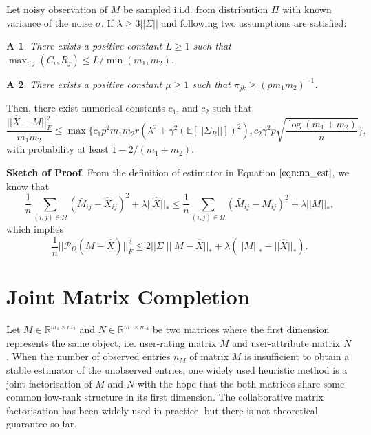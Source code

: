 \documentclass{article} %
\newtheorem{assumption}{A}
\begin{document}
\begin{theorem} 
Let noisy observation of $M$ be sampled i.i.d. from distribution $\Pi$ with known variance of the noise $\sigma$. If $\lambda \geq 3||\Sigma||$ and following two assumptions are satisfied:

\begin{assumption}
There exists a positive constant $L \geq 1 $ such that
$\max_{i,j}(C_i, R_j) \leq L / \min(m_1, m_2)$.
\end{assumption}

\begin{assumption}
There exists a positive constant $\mu \geq 1 $ such that
$\pi_{jk} \geq (p m_1 m_2)^{-1}$.
\end{assumption}

Then, there exist numerical constants $c_1$, and $c_2$ such that
\begin{equation}
\frac{||\hat{X} - M||_F^2}{m_1m_2} \leq \max\bigg\{ c_1 p^2 m_1 m_2 r (\lambda^2 + \gamma^2(\mathbb{E}[||\Sigma_R||])^2), c_2\gamma^2p\sqrt{\frac{\log(m_1 + m_2)}{n}} \bigg\},
\end{equation}
with probability at least $1 - 2/(m_1 + m_2)$.
\end{theorem}

\textbf{Sketch of Proof}. From the definition of estimator in Equation $\ref{eqn:nn_est}$, we know that
\begin{equation}
\frac{1}{n} \sum_{(i,j) \in \Omega}(\bar{M}_{ij} - \hat{X}_{ij})^2 + \lambda||\hat{X}||_*
\leq \frac{1}{n} \sum_{(i,j) \in \Omega}(\bar{M}_{ij} - {M}_{ij})^2 + \lambda||M||_*,
\end{equation}
which implies
\begin{equation}
\frac{1}{n}||\mathcal{P}_\Omega(M - \hat{X}) ||_F^2 \leq 2||\Sigma|| ||M - \hat{X}||_* + \lambda(||M||_* - ||\hat{X}||_*).
\end{equation}


\section{Joint Matrix Completion}
Let $M \in \mathbb{R}^{m_1 \times m_2}$ and $N \in \mathbb{R}^{m_1 \times m_3}$ be two matrices where the first dimension represents the same object, i.e. user-rating matrix $M$ and user-attribute matrix $N$. When the number of observed entries $n_M$ of matrix $M$ is insufficient to obtain a stable estimator of the unobserved entries, one widely used heuristic method is a joint factorisation of $M$ and $N$ with the hope that the both matrices share some common low-rank structure in its first dimension. The collaborative matrix factorisation has been widely used in practice, but there is not theoretical guarantee so far.
\end{document}
